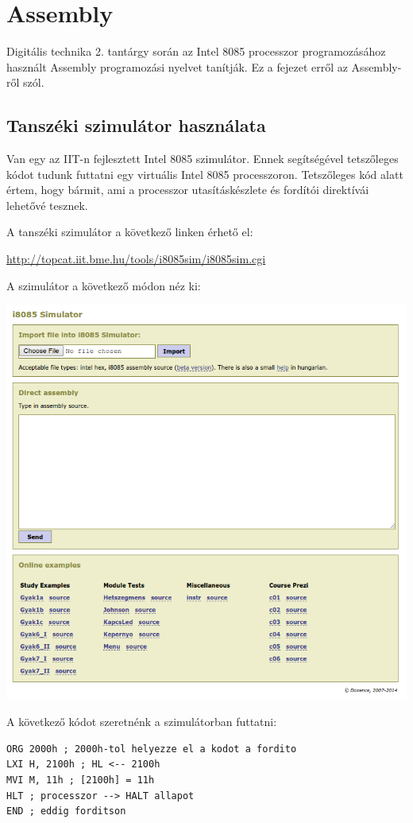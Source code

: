 \documentclass{article}
\begin{document}
\section{Assembly}
Digitális technika 2. tantárgy során az Intel 8085 processzor programozásához használt Assembly programozási nyelvet tanítják. Ez a fejezet erről az Assembly-ről szól.
\subsection{Tanszéki szimulátor használata}
Van egy az IIT-n fejlesztett Intel 8085 szimulátor. Ennek segítségével tetszőleges kódot tudunk futtatni egy virtuális Intel 8085 processzoron. Tetszőleges kód alatt értem, hogy bármit, ami a processzor utasításkészlete és fordítói direktívái lehetővé tesznek.

A tanszéki szimulátor a következő linken érhető el:

\url{http://topcat.iit.bme.hu/tools/i8085sim/i8085sim.cgi}

A szimulátor a következő módon néz ki:

\includegraphics[scale=0.5]{sim.png}

A következő kódot szeretnénk a szimulátorban futtatni:
\begin{lstlisting}[frame=single]
ORG 2000h ; 2000h-tol helyezze el a kodot a fordito
LXI H, 2100h ; HL <-- 2100h
MVI M, 11h ; [2100h] = 11h
HLT ; processzor --> HALT allapot
END ; eddig forditson
\end{lstlisting}
\end{document}
